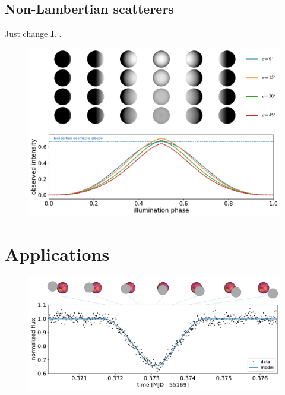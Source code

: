 \documentclass[modern]{aastex62}
\begin{document}
\subsection{Non-Lambertian scatterers}
\label{sec:nonlambertian}
Just change $\mathbf{I}$. \citep{OrenNayar1994}.

\begin{figure}[h!]
    \begin{centering}
        \includegraphics[width=\linewidth]{figures/oren_nayar.pdf}
    \end{centering}
\end{figure}
%

\section{Applications}
\label{sec:applications}

\begin{figure}[h!]
    \begin{centering}
        \includegraphics[width=\linewidth]{figures/io_europa.pdf}
    \end{centering}
\end{figure}
%
\end{document}
